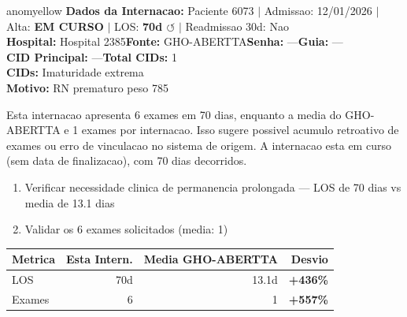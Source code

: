 \documentclass[a4paper,10pt]{article}
\begin{document}
\begin{anomalycard}[Internacao 7245 | GHO-ABERTTA | MODERADO (z=2.67)]{anomyellow}
\textbf{Dados da Internacao:} Paciente 6073 $\mid$ Admissao: 12/01/2026 $\mid$ Alta: \textcolor{anomorange}{\textbf{EM CURSO}} $\mid$ LOS: \textbf{70d \textcolor{anomorange}{$\circlearrowleft$}} $\mid$ Readmissao 30d: Nao\\
\textbf{Hospital:} Hospital 2385\quad\textbf{Fonte:} GHO-ABERTTA\quad\textbf{Senha:} ---\quad\textbf{Guia:} ---\\
\textbf{CID Principal:} {\small ---}\quad\textbf{Total CIDs:} 1\\

\textbf{CIDs:} {\scriptsize Imaturidade extrema}\\

\textbf{Motivo:} {\scriptsize RN prematuro  peso 785}\\

\vspace{2pt}\begin{tcolorbox}[colback=severityred!20,colframe=anomyellow,title={\textbf{Interpretacao de Negocio}},fonttitle=\bfseries\small,left=4pt,right=4pt,top=3pt,bottom=3pt]
{\small Esta internacao apresenta 6 exames em 70 dias, enquanto a media do GHO-ABERTTA e 1 exames por internacao. Isso sugere possivel acumulo retroativo de exames ou erro de vinculacao no sistema de origem. A internacao esta em curso (sem data de finalizacao), com 70 dias decorridos.}
\end{tcolorbox}
\begin{tcolorbox}[colback=severityyellow!30,colframe=anomorange,title={\textbf{Recomendacoes Especificas}},fonttitle=\bfseries\small,left=4pt,right=4pt,top=3pt,bottom=3pt]
\begin{enumerate}[nosep,leftmargin=16pt]
\item {\small Verificar necessidade clinica de permanencia prolongada --- LOS de 70 dias vs media de 13.1 dias}
\item {\small Validar os 6 exames solicitados (media: 1)}
\end{enumerate}
\end{tcolorbox}
\begin{center}\begin{tabular}{l r r r}\toprule\textbf{Metrica} & \textbf{Esta Intern.} & \textbf{Media GHO-ABERTTA} & \textbf{Desvio} \\\midrule
LOS & 70d & 13.1d & \textcolor{anomred}{\textbf{+436\%}} \\
Exames & 6 & 1 & \textcolor{anomred}{\textbf{+557\%}} \\
\bottomrule\end{tabular}\end{center}


\end{anomalycard}
\end{document}
